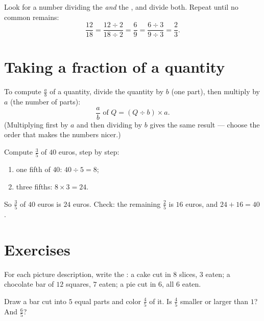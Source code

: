 \begin{method}\label{met:g6:fractions:simplify}
Look for a number dividing the  \emph{and} the ,
and divide both. Repeat until no common  remains:
\[
\frac{12}{18} = \frac{12 \div 2}{18 \div 2} = \frac{6}{9}
= \frac{6 \div 3}{9 \div 3} = \frac{2}{3}.
\]
\end{method}

\section{Taking a fraction of a quantity}

\begin{method}\label{met:g6:fractions:ofquantity}
To compute $\frac ab$ of a quantity, divide the quantity by $b$ (one
part), then multiply by $a$ (the number of parts):
\[
\frac ab \text{ of } Q = (Q \div b) \times a .
\]
(Multiplying first by $a$ and then dividing by $b$ gives the same
result --- choose the order that makes the numbers nicer.)
\end{method}

\begin{example}\label{ex:g6:fractions:ofquantity}
Compute $\frac35$ of $40$ euros, step by step:
\begin{enumerate}
  \item one fifth of $40$: $40 \div 5 = 8$;
  \item three fifths: $8 \times 3 = 24$.
\end{enumerate}
So $\frac35$ of $40$ euros is $24$ euros. Check: the remaining
$\frac25$ is $16$ euros, and $24 + 16 = 40$.
\end{example}

\section{Exercises}

\begin{exercise}[$\star$]\label{exo:g6:fractions:1}
For each picture description, write the : a cake cut in $8$
slices, $3$ eaten; a chocolate bar of $12$ squares, $7$ eaten; a pie
cut in $6$, all $6$ eaten.
\end{exercise}

\begin{exercise}[$\star$]\label{exo:g6:fractions:2}
Draw a bar cut into $5$ equal parts and color $\frac45$ of it. Is
$\frac45$ smaller or larger than $1$? And $\frac65$?
\end{exercise}

